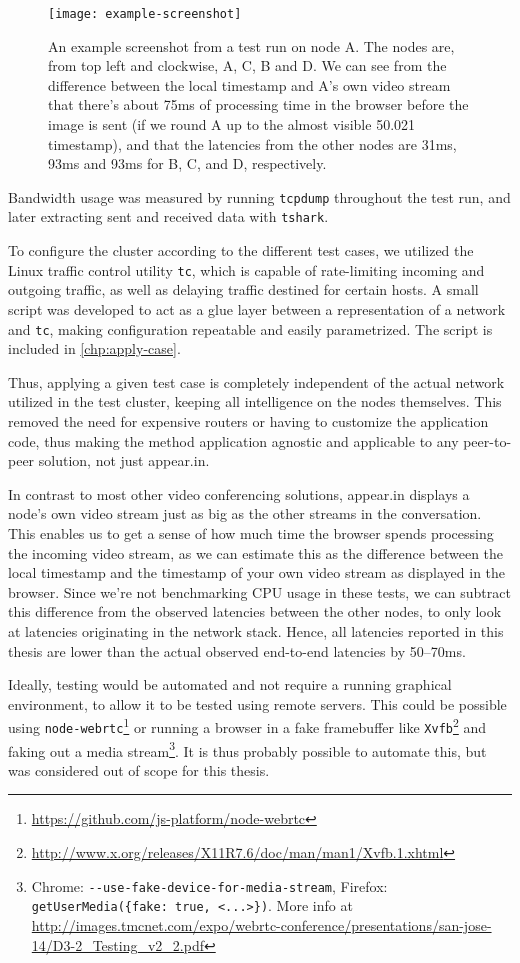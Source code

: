 \begin{figure}
    \centering
    \texttt{[image: example-screenshot]}
    \caption{An example screenshot from a test run on node A. The nodes are, from top left and clockwise, A, C, B and D. We can see from the difference between the local timestamp and A's own video stream that there's about 75ms of processing time in the browser before the image is sent (if we round A up to the almost visible 50.021 timestamp), and that the latencies from the other nodes are 31ms, 93ms and 93ms for B, C, and D, respectively.}
    \label{fig:example-screenshot}
\end{figure}

Bandwidth usage was measured by running \texttt{tcpdump} throughout the test run, and later extracting sent and received data with \texttt{tshark}.

To configure the cluster according to the different test cases, we utilized the Linux traffic control utility \texttt{tc}, which is capable of rate-limiting incoming and outgoing traffic, as well as delaying traffic destined for certain hosts. A small script was developed to act as a glue layer between a representation of a network and \texttt{tc}, making configuration repeatable and easily parametrized. The script is included in \autoref{chp:apply-case}.

Thus, applying a given test case is completely independent of the actual network utilized in the test cluster, keeping all intelligence on the nodes themselves. This removed the need for expensive routers or having to customize the application code, thus making the method application agnostic and applicable to any peer-to-peer solution, not just appear.in.

In contrast to most other video conferencing solutions, appear.in displays a node's own video stream just as big as the other streams in the conversation. This enables us to get a sense of how much time the browser spends processing the incoming video stream, as we can estimate this as the difference between the local timestamp and the timestamp of your own video stream as displayed in the browser. Since we're not benchmarking CPU usage in these tests, we can subtract this difference from the observed latencies between the other nodes, to only look at latencies originating in the network stack. Hence, all latencies reported in this thesis are lower than the actual observed end-to-end latencies by 50--70ms.

Ideally, testing would be automated and not require a running graphical environment, to allow it to be tested using remote servers. This could be possible using \texttt{node-webrtc}\footnote{\url{https://github.com/js-platform/node-webrtc}} or running a browser in a fake framebuffer like \texttt{Xvfb}\footnote{\url{http://www.x.org/releases/X11R7.6/doc/man/man1/Xvfb.1.xhtml}} and faking out a media stream\footnote{Chrome: \texttt{-{}-use-fake-device-for-media-stream}, Firefox: \texttt{getUserMedia(\{fake: true, <...>\})}. More info at \url{http://images.tmcnet.com/expo/webrtc-conference/presentations/san-jose-14/D3-2_Testing_v2_2.pdf}}. It is thus probably possible to automate this, but was considered out of scope for this thesis.

